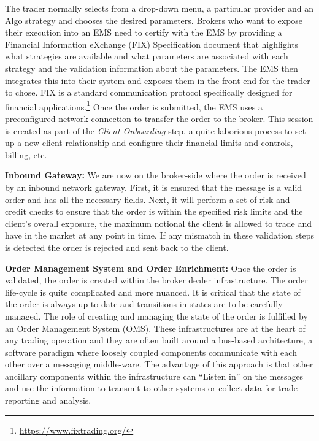 The trader normally selects from a drop-down menu, a particular provider and an Algo strategy and  chooses the desired parameters. Brokers who want to expose their execution into an EMS need to certify with the EMS by providing a Financial Information eXchange (FIX) Specification document that highlights what strategies are available and what parameters are associated with each strategy and the validation information about the parameters. The EMS then integrates this into their system and exposes them in the front end for the trader to chose. FIX is a standard communication protocol specifically designed for financial applications.\footnote{\url{https://www.fixtrading.org/}} Once the order is submitted, the EMS uses a preconfigured network connection to transfer the order to the broker. This session is created as part of the \emph{Client Onboarding} step, a quite laborious process to set up a new client relationship and configure their financial limits and controls, billing, etc. \label{in:trad_infr2} \twomedskip


\noindent\textbf{Inbound Gateway:} We are now on the broker-side where the order is received by an inbound network gateway. First, it is ensured that the message is a valid order and has all the necessary fields. Next, it will perform a set of risk and credit checks to ensure that the order is within the specified risk limits and the client's overall exposure, the maximum notional the client is allowed to trade and have in the market at any point in time. If any mismatch in these validation steps is detected the order is rejected and sent back to the client. \twomedskip


\noindent\textbf{Order Management System and Order Enrichment:} Once the order is validated, the order is created within the broker dealer infrastructure. The order life-cycle is quite complicated and more nuanced. It is critical that the state of the order is always up to date and transitions in states are to be carefully managed. The role of creating and managing the state of the order is fulfilled by an Order Management System (OMS). These infrastructures are at the heart of any trading operation and they are often built around a bus-based architecture, a software paradigm where loosely coupled components communicate with each other over a messaging middle-ware. The advantage of this approach is that other ancillary components within the infrastructure can ``Listen in'' on the messages and use the information to transmit to other systems or collect data for trade reporting and analysis.


